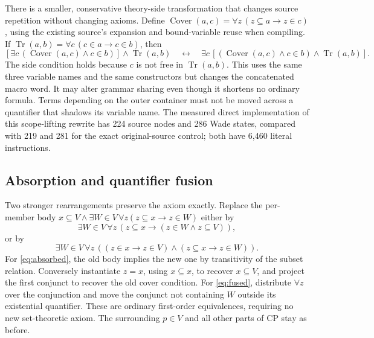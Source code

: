 \documentclass[11pt]{article}
\begin{document}
There is a smaller, conservative theory-side transformation that changes
source repetition without changing axioms.  Define
$\operatorname{Cover}(a,c)=\forall z\,(z\subseteq a\to z\in c)$,
using the existing source's expansion and bound-variable reuse when compiling.
If
$\operatorname{Tr}(a,b)=\forall c\,(c\in a\to c\in b)$, then
\[
 [\exists c\,(\operatorname{Cover}(a,c)\land c\in b)]
       \land\operatorname{Tr}(a,b)
 \quad\longleftrightarrow\quad
 \exists c\,[(\operatorname{Cover}(a,c)\land c\in b)
       \land\operatorname{Tr}(a,b)].
\]
The side condition holds because $c$ is not free in
$\operatorname{Tr}(a,b)$.  This uses the same three variable names and the
same constructors but changes the concatenated macro word.  It may alter
grammar sharing even though it shortens no ordinary formula.  Terms depending
on the outer container must not be moved across a quantifier that shadows its
variable name.  The measured direct implementation of this scope-lifting
rewrite has 224 source nodes and 286 Wade states, compared with 219 and 281
for the exact original-source control; both have 6,460 literal instructions.

\subsection{Absorption and quantifier fusion}

Two stronger rearrangements preserve the axiom exactly.  Replace the
per-member body $x\subseteq V\land\exists W\in V\,\forall z
(z\subseteq x\to z\in W)$ either by
\begin{equation}\label{eq:absorbed}
 \exists W\in V\,\forall z\,
       (z\subseteq x\longrightarrow(z\in W\land z\subseteq V)),
\end{equation}
or by
\begin{equation}\label{eq:fused}
 \exists W\in V\,\forall z\,
       ((z\in x\longrightarrow z\in V)\land
        (z\subseteq x\longrightarrow z\in W)).
\end{equation}
For \eqref{eq:absorbed}, the old body implies the new one by transitivity of
the subset relation.  Conversely instantiate $z=x$, using $x\subseteq x$,
to recover $x\subseteq V$, and project the first conjunct to recover the old
cover condition.  For \eqref{eq:fused}, distribute $\forall z$ over the
conjunction and move the conjunct not containing $W$ outside its existential
quantifier.  These are ordinary first-order equivalences, requiring no new
set-theoretic axiom.  The surrounding $p\in V$ and all other parts of CP
stay as before.
\end{document}
